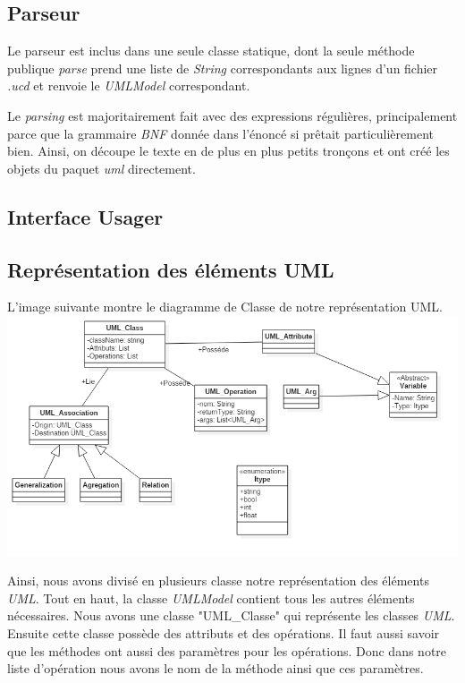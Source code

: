 \documentclass[letter,french]{report}
\begin{document}
	\subsection*{Parseur}
	Le parseur est inclus dans une seule classe statique, dont la seule méthode
	publique \emph{parse} prend une liste de \emph{String} correspondants aux lignes d'un
	fichier \emph{.ucd} et renvoie le \emph{UMLModel} correspondant. 
	
	Le \emph{parsing} est majoritairement fait avec des expressions régulières,
	principalement parce que la grammaire \emph{BNF} donnée dans l'énoncé si
	prêtait particulièrement bien. Ainsi, on découpe le texte en de plus en plus
	petits tronçons et ont créé les objets du paquet \emph{uml} directement.
	
	\subsection*{Interface Usager}
	
	
	\subsection*{Représentation des éléments UML}
	L'image suivante montre le diagramme de Classe de notre représentation UML.
	\newline 
	\includegraphics[scale=.3]{DiagrammeClasse.png}
	
	Ainsi, nous avons divisé en plusieurs classe notre représentation des éléments
	\emph{UML}. Tout en haut, la classe \emph{UMLModel} contient tous les autres
	éléments nécessaires. Nous avons une classe "UML\_Classe" qui représente les
	classes \emph{UML}. Ensuite cette classe possède des attributs et des opérations. Il faut aussi savoir que les méthodes ont aussi  des paramètres pour les opérations. Donc dans notre liste d'opération nous avons le nom de la méthode ainsi que ces paramètres. 
	
\end{document}

